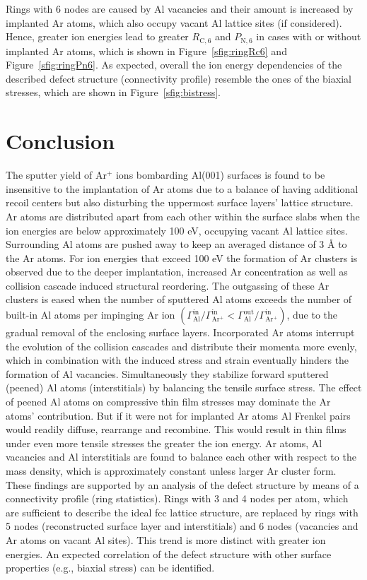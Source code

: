 \documentclass[12pt,a4paper,preprint,superscriptaddress]{revtex4-1}
\begin{document}
Rings with 6 nodes are caused by Al vacancies and their amount is increased by implanted Ar atoms, which also occupy vacant Al lattice sites (if considered). Hence, greater ion energies lead to greater $R_{\mathrm{C},6}$ and $P_{\mathrm{N},6}$ in cases with or without implanted Ar atoms, which is shown in Figure~\ref{sfig:ringRc6} and Figure~\ref{sfig:ringPn6}. As expected, overall the ion energy dependencies of the described defect structure (connectivity profile) resemble the ones of the biaxial stresses, which are shown in Figure~\ref{sfig:bistress}. 


\section{Conclusion}
\label{sec:conclusion}

The sputter yield of Ar$^+$ ions bombarding Al(001) surfaces is found to be insensitive to the implantation of Ar atoms due to a balance of having additional recoil centers but also disturbing the uppermost surface layers' lattice structure. Ar atoms are distributed apart from each other within the surface slabs when the ion energies are below approximately 100 eV, occupying vacant Al lattice sites. Surrounding Al atoms are pushed away to keep an averaged distance of 3 \r A to the Ar atoms. For ion energies that exceed 100 eV the formation of Ar clusters is observed due to the deeper implantation, increased Ar concentration as well as collision cascade induced structural reordering. The outgassing of these Ar clusters is eased when the number of sputtered Al atoms exceeds the number of built-in Al atoms per impinging Ar ion $\left(\Gamma_\mathrm{Al}^\mathrm{in}/\Gamma_\mathrm{Ar^+}^\mathrm{in}<\Gamma_\mathrm{Al}^\mathrm{out}/\Gamma_\mathrm{Ar^+}^\mathrm{in}\right)$, due to the gradual removal of the enclosing surface layers. Incorporated Ar atoms interrupt the evolution of the collision cascades and distribute their momenta more evenly, which in combination with the induced stress and strain eventually hinders the formation of Al vacancies. Simultaneously they stabilize forward sputtered (peened) Al atoms (interstitials) by balancing the tensile surface stress. The effect of peened Al atoms on compressive thin film stresses may dominate the Ar atoms' contribution. But if it were not for implanted Ar atoms Al Frenkel pairs would readily diffuse, rearrange and recombine. This would result in thin films under even more tensile stresses the greater the ion energy. Ar atoms, Al vacancies and Al interstitials are found to balance each other with respect to the mass density, which is approximately constant unless larger Ar cluster form. These findings are supported by an analysis of the defect structure by means of a connectivity profile (ring statistics). Rings with 3 and 4 nodes per atom, which are sufficient to describe the ideal fcc lattice structure, are replaced by rings with 5 nodes (reconstructed surface layer and interstitials) and 6 nodes (vacancies and Ar atoms on vacant Al sites). This trend is more distinct with greater ion energies. An expected correlation of the defect structure with other surface properties (e.g., biaxial stress) can be identified.
\end{document}
